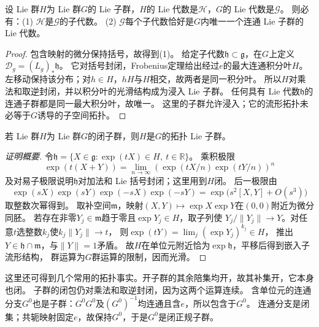\begin{theorem}\label{chlg:thm_suglieg}
    设 Lie 群$H$为 Lie 群$G$的 Lie 子群，$H$的 Lie 代数是$\mathscr{H}$，$G$的 Lie 代数是$\mathscr{G}$。
    则必有：(1) $\mathscr{H}$是$\mathscr{G}$的子代数。
    (2) $\mathscr{G}$每个子代数恰好是$G$内唯一一个连通 Lie 子群的 Lie 代数。
\end{theorem}
\begin{proof}
包含映射的微分保持括号，故得到(1)。
给定子代数$\mathfrak h\subset\mathfrak g$，在$G$上定义
$\mathcal D_g=(L_g)_*\mathfrak h$。
它对括号封闭，Frobenius定理给出经过$e$的最大连通积分叶$H$。
左移动保持该分布；对$h\in H$，$hH$与$H$相交，故两者是同一积分叶。
所以$H$对乘法和取逆封闭，并以积分叶的光滑结构成为浸入 Lie 子群。
任何具有 Lie 代数$\mathfrak h$的连通子群都是同一最大积分叶，故唯一。
这里的子群允许浸入；它的流形拓扑未必等于$G$诱导的子空间拓扑。
\end{proof}

\begin{theorem}\label{chlg:thm_subg-cartan}
    若 Lie 群$H$为 Lie 群$G$的闭子群，则$H$是$G$的拓扑 Lie 子群。
\end{theorem}
\begin{proof}[证明概要]
令$\mathfrak h=\{X\in\mathfrak g:\exp(tX)\in H,\ t\in\mathbb R\}$。
乘积极限
\[
 \exp(t(X+Y))=\lim_{n\to\infty}(\exp(tX/n)\exp(tY/n))^n
\]
及对易子极限说明$\mathfrak h$对加法和 Lie 括号封闭；这里用到$H$闭。
后一极限由
\[
 \exp(sX)\exp(sY)\exp(-sX)\exp(-sY)
 =\exp\bigl(s^2[X,Y]+O(s^3)\bigr)
\]
取整数次幂得到。
取补空间$\mathfrak m$，映射$(X,Y)\mapsto\exp X\exp Y$在$(0,0)$附近为微分同胚。
若存在非零$Y_j\in\mathfrak m$趋于零且$\exp Y_j\in H$，取子列使
$Y_j/\|Y_j\|\to Y$。对任意$t$选整数$k_j$使$k_j\|Y_j\|\to t$，
则$\exp(tY)=\lim_j(\exp Y_j)^{k_j}\in H$，
推出$Y\in\mathfrak h\cap\mathfrak m$，与$\|Y\|=1$矛盾。
故$H$在单位元附近恰为$\exp\mathfrak h$，平移后得到嵌入子流形结构，
群运算为$G$群运算的限制，因而光滑。
\end{proof}

这里还可得到几个常用的拓扑事实。开子群的其余陪集均开，故其补集开，它本身也闭。
子群的闭包仍对乘法和取逆封闭，因为这两个运算连续。
含单位元的连通分支$G^0$也是子群：$G^0G^0$及$(G^0)^{-1}$均连通且含$e$，所以包含于$G^0$。
连通分支是闭集；共轭映射固定$e$，故保持$G^0$，于是$G^0$是闭正规子群。

